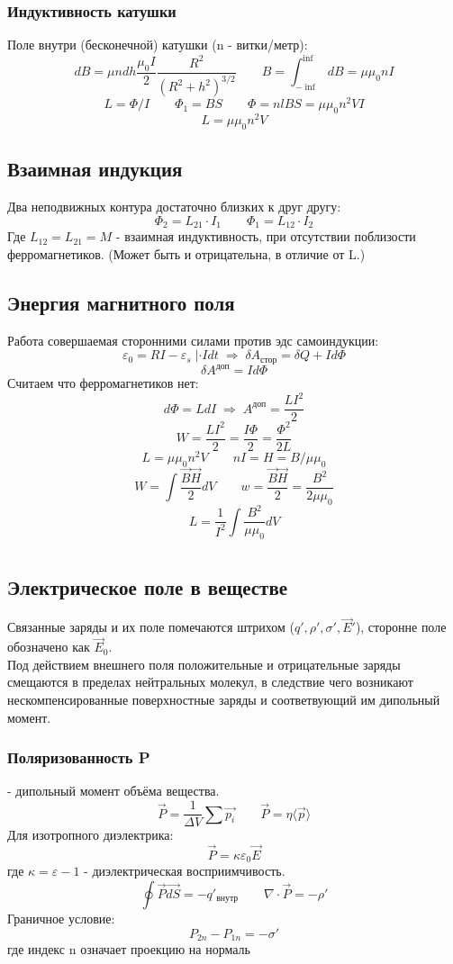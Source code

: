 \documentclass{article}
\begin{document}
\subsubsection{Индуктивность катушки}
Поле внутри (бесконечной) катушки (n - витки/метр):
\[dB=\mu ndh\frac{\mu_0 I}{2}\frac{R^2}{(R^2+h^2)^{3/2}} \qquad B=\int_{-\inf}^{\inf}dB=\mu\mu_0 nI\]
\[L=\varPhi/I \qquad \varPhi_1=BS \qquad \varPhi=nlBS=\mu\mu_{0}n^2VI\]
\[L=\mu\mu_0n^2V\]
\subsection{Взаимная индукция}
Два неподвижных контура достаточно близких к друг другу:
\[\Phi_{2}=L_{21}\cdot I_{1} \qquad \Phi_{1}=L_{12}\cdot I_{2}\]
Где $L_{12}=L_{21}=M$ - взаимная индуктивность, при отсутствии поблизости ферромагнетиков. (Может быть и отрицательна, в отличие от L.)
\subsection{Энергия магнитного поля}
Работа совершаемая сторонними силами против эдс самоиндукции:
\[\varepsilon_{0}=RI-\varepsilon_{s} \; |\cdot Idt \; \Rightarrow \; \delta A_{\text{стор}}=\delta Q + Id\Phi\]
\[\delta A^{\text{доп}}=Id\Phi\]
Считаем что ферромагнетиков нет:
\[d\Phi=LdI \; \Rightarrow \; A^{\text{доп}}=\frac{LI^2}{2}\]
\[W=\frac{LI^2}{2}=\frac{I\Phi}{2}=\frac{\Phi^2}{2L}\]
\[L=\mu\mu_0n^2V \qquad nI=H=B/\mu\mu_0\]
\[W=\int\frac{\vec{B}\vec{H}}{2}dV \qquad w=\frac{\vec{B}\vec{H}}{2}=\frac{B^2}{2\mu\mu_{0}}\]
\[L=\frac{1}{I^2}\int\frac{B^2}{\mu\mu_{0}}dV\]


\section{}
\subsection{Электрическое поле в веществе}
Связанные заряды и их поле помечаются штрихом ($q', \rho', \sigma', \vec{E}'$), сторонне поле обозначено как $\vec{E}_{0}$. \\
Под действием внешнего поля положительные и отрицательные заряды смещаются в пределах нейтральных молекул, в следствие чего возникают нескомпенсированные поверхностные заряды и соответвующий им дипольный момент.
\subsubsection{Поляризованность P}
- дипольный момент объёма вещества.
\[\vec{P}=\frac{1}{\Delta V}\sum\vec{p_{i}} \qquad \vec{P}=\eta\langle\vec{p}\rangle\]
Для изотропного диэлектрика:
\[\vec{P}=\kappa\varepsilon_{0}\vec{E}\]
где $\kappa=\varepsilon-1$ - диэлектрическая восприимчивость.
\[\oint\vec{P}\vec{dS}=-q'_{\text{внутр}} \qquad \nabla\cdot\vec{P}=-\rho'\]
Граничное условие:
\[P_{2n}-P_{1n}=-\sigma'\]
где индекс n означает проекцию на нормаль
\end{document}
